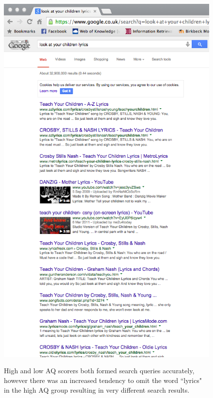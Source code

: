 \documentclass[a4paper, 11pt]{article}
\begin{document}
\begin{enumerate}
{\begin{figure}[H]
\begin{center}
\includegraphics[scale=0.7]{lookAtUrChildrenLyrics}\\
\caption{High and low AQ scorers both formed search queries accurately, however there was an increased tendency to omit the word ``lyrics" in the high AQ group resulting in very different search results.}
\label{someresults}
\end{center}
\end{figure}
}


\end{enumerate}
\end{document}
